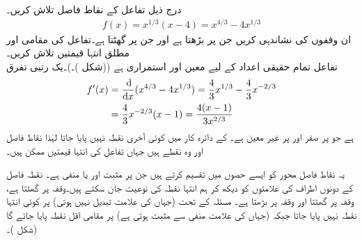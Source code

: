 

درج ذیل تفاعل کے نقاط فاصل تلاش کریں۔
\begin{align*}
f(x)=x^{1/3}(x-4)=x^{4/3}-4x^{1/3}
\end{align*}
ان وقفوں کی نشاندہی کریں جن  پر  بڑھتا ہے اور جن پر  گھٹتا ہے۔تفاعل کی  مقامی اور مطلق انتہا قیمتیں تلاش کریں۔\\
تفاعل تمام حقیقی اعداد کے لیے معین اور استمراری ہے ((شکل )۔)۔یک رتبی تفرق
\begin{align*}
f'(x)&=\frac{\dif}{\dif x}(x^{4/3}-4x^{1/3})=\frac{4}{3}x^{1/3}-\frac{4}{3}x^{-2/3}\\
&=\frac{4}{3}x^{-2/3}(x-1)=\frac{4(x-1)}{3x^{2/3}}
\end{align*}
ہے جو  پر صفر اور  پر غیر معین ہے۔ کے دائرہ کار میں کوئی آخری نقطہ نہیں پایا جاتا  لہٰذا نقاط فاصل  اور  وہ نقطے ہیں جہاں تفاعل کی انتہا قیمتیں ممکن ہیں۔

یہ نقاط فاصل محور  کو ایسے حصوں میں تقسیم کرتے ہیں جن  پر    مثبت اور یا منفی ہے۔  نقطہ فاصل کے دونوں اطراف  کی علامتوں کو دیکھ کر ہم  انتہا  نقطہ کی نوعیت جان سکتے ہیں۔وقفہ  پر  گھٹتا ہے، وقفہ  پر گھٹتا  اور وقفہ  پر بڑھتا ہے۔  مسئلہ  کے تحت  (جہاں  کی علامت تبدیل نہیں ہوتی) پر کوئی انتہا نقطہ نہیں پایا جاتا   جبکہ  (جہاں  کی علامت منفی سے  مثبت ہوتی ہے) پر مقامی اقل نقطہ پایا جائے گا  (شکل )۔ 

